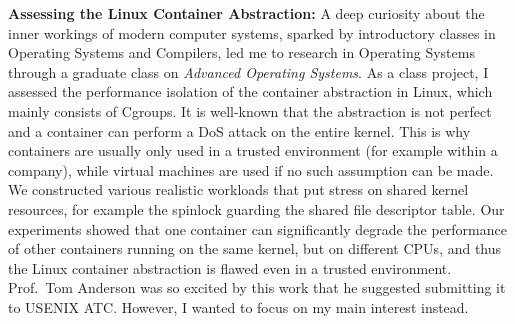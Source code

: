\documentclass{article}
\newcommand{\todo}[1]{{\color{red}\bfseries [[#1]]}}
\renewcommand{\todo}[1]{\relax}
\begin{document}
\textbf{Assessing the Linux Container Abstraction:}
A deep curiosity about the inner workings of modern
computer systems, sparked by introductory classes in Operating Systems and Compilers, led me to research in Operating Systems through a graduate class on \emph{Advanced Operating Systems}. As a class project, I assessed the performance isolation of the container abstraction in Linux, which mainly consists of Cgroups. It is well-known that the abstraction is not perfect and a container can perform a DoS attack on the entire kernel.
\todo{If this is well-known, then how are your observations (which are
  about performance degradation) a novel contribution?}
This is why containers are usually only used in a trusted
environment\todo{What is the definition of ``trusted environment''?}
(for example within a company), while virtual machines are used if no such assumption can be made.
\todo{How do virtual machines fix the problem?  Also, I am confused because
this sentence introduced the notion of virtual machines, but they are not
discussed again.  The following text returns to containers, so how is this
sentence about virtual machines relevant?}
We constructed various realistic workloads that put stress on shared kernel resources, for example the spinlock guarding the shared file descriptor table. Our experiments showed that one container can significantly degrade the performance of other containers running on the same kernel, but on different CPUs, and thus the Linux container abstraction is flawed even in a trusted environment.
Prof.\ Tom Anderson was so excited by this work that he suggested submitting it to USENIX ATC. However, I wanted to focus on my main interest instead.\\
\end{document}
